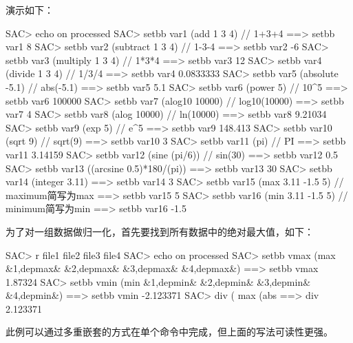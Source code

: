演示如下：
\begin{SACCode}
SAC> echo on processed
SAC> setbb var1 (add 1 3 4)         // 1+3+4
 ==>  setbb var1 8
SAC> setbb var2 (subtract 1 3 4)    // 1-3-4
 ==>  setbb var2 -6
SAC> setbb var3 (multiply 1 3 4)    // 1*3*4
 ==>  setbb var3 12
SAC> setbb var4 (divide 1 3 4)      // 1/3/4
 ==>  setbb var4 0.0833333
SAC> setbb var5 (absolute -5.1)     // abs(-5.1)
 ==>  setbb var5 5.1
SAC> setbb var6 (power 5)           // 10^5
 ==>  setbb var6 100000
SAC> setbb var7 (alog10 10000)      // log10(10000)
 ==>  setbb var7 4
SAC> setbb var8 (alog 10000)        // ln(10000)
 ==>  setbb var8 9.21034
SAC> setbb var9 (exp 5)             // e^5
 ==>  setbb var9 148.413
SAC> setbb var10 (sqrt 9)           // sqrt(9)
 ==>  setbb var10 3
SAC> setbb var11 (pi)               // PI
 ==>  setbb var11 3.14159
 SAC> setbb var12 (sine (pi/6))     // sin(30)
 ==>  setbb var12 0.5
SAC> setbb var13 ((arcsine 0.5)*180/(pi))
 ==>  setbb var13 30
SAC> setbb var14 (integer 3.11)
 ==>  setbb var14 3
SAC> setbb var15 (max 3.11 -1.5 5)  // maximum简写为max
 ==>  setbb var15 5
SAC> setbb var16 (min 3.11 -1.5 5)  // minimum简写为min
 ==>  setbb var16 -1.5
\end{SACCode}

为了对一组数据做归一化，首先要找到所有数据中的绝对最大值，如下：
\begin{SACCode}
SAC> r file1 file2 file3 file4
SAC> echo on processed
SAC> setbb vmax (max &1,depmax& &2,depmax& &3,depmax& &4,depmax&)
 ==> setbb vmax 1.87324
SAC> setbb vmin (min &1,depmin& &2,depmin& &3,depmin& &4,depmin&)
 ==> setbb vmin -2.123371
SAC> div ( max (abs %
 ==>  div 2.123371
\end{SACCode}
此例可以通过多重嵌套的方式在单个命令中完成，但上面的写法可读性更强。

